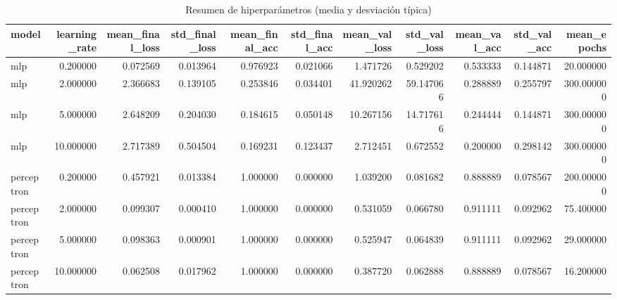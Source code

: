 \begin{table}
\caption{Resumen de hiperparámetros (media y desviación típica)}
\label{tab:hyperparam_summary}
\begin{tabular}{lrrrrrrrrrr}
\toprule
model & learning_rate & mean_final_loss & std_final_loss & mean_final_acc & std_final_acc & mean_val_loss & std_val_loss & mean_val_acc & std_val_acc & mean_epochs \\
\midrule
mlp & 0.200000 & 0.072569 & 0.013964 & 0.976923 & 0.021066 & 1.471726 & 0.529202 & 0.533333 & 0.144871 & 20.000000 \\
mlp & 2.000000 & 2.366683 & 0.139105 & 0.253846 & 0.034401 & 41.920262 & 59.147066 & 0.288889 & 0.255797 & 300.000000 \\
mlp & 5.000000 & 2.648209 & 0.204030 & 0.184615 & 0.050148 & 10.267156 & 14.717616 & 0.244444 & 0.144871 & 300.000000 \\
mlp & 10.000000 & 2.717389 & 0.504504 & 0.169231 & 0.123437 & 2.712451 & 0.672552 & 0.200000 & 0.298142 & 300.000000 \\
perceptron & 0.200000 & 0.457921 & 0.013384 & 1.000000 & 0.000000 & 1.039200 & 0.081682 & 0.888889 & 0.078567 & 200.000000 \\
perceptron & 2.000000 & 0.099307 & 0.000410 & 1.000000 & 0.000000 & 0.531059 & 0.066780 & 0.911111 & 0.092962 & 75.400000 \\
perceptron & 5.000000 & 0.098363 & 0.000901 & 1.000000 & 0.000000 & 0.525947 & 0.064839 & 0.911111 & 0.092962 & 29.000000 \\
perceptron & 10.000000 & 0.062508 & 0.017962 & 1.000000 & 0.000000 & 0.387720 & 0.062888 & 0.888889 & 0.078567 & 16.200000 \\
\bottomrule
\end{tabular}
\end{table}
